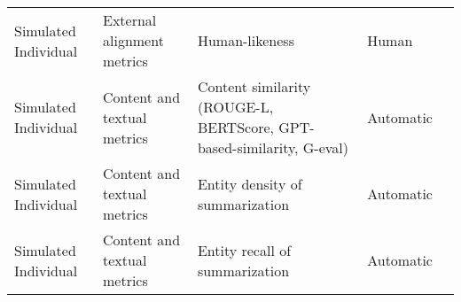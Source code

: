 \begin{small}
\begin{center}
\begin{longtable}{@{}p{}p{}p{}p{}p{}@{}}
Simulated Individual     & External alignment metrics          & Human-likeness                                                                                                                                                                                              & Human     & \cite{Zhang2024SpeechAgentsHS}                                                                                                                                                                                                                                                                                                                                                                                                   \\
Simulated Individual     & Content and textual metrics         & Content similarity (ROUGE-L, BERTScore, GPT-based-similarity, G-eval)                                                                                                                                       & Automatic & \cite{10.1145/3643834.3660729}                                                                                                                                                                                                                                                                                                                                                                                \\
Simulated Individual     & Content and textual metrics         & Entity density of summarization                                                                                                                                                                             & Automatic & \cite{liu2024roleagent}                                                                                                                                                                                                                                                                                                                                                                                           \\
Simulated Individual     & Content and textual metrics         & Entity recall of summarization                                                                                                                                                                              & Automatic & \cite{liu2024roleagent}                                                                                                                                                                                                                                                                                                                                                                                           \\

\end{longtable}
\end{center}
\end{small}
